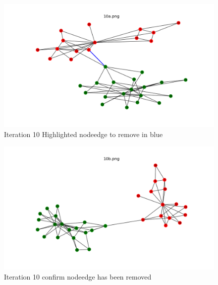 \documentclass[12pt]{article}
\begin{document}
\begin{figure}[H]
\centering
\includegraphics[trim=0 0 0 0, clip, width=\textwidth] {10a.png}
\caption{Iteration 10 Highlighted nodeedge to remove in blue }
\label{fig:q110a}
\end{figure}
\begin{figure}[H]
\centering
\includegraphics[trim=0 0 0 0, clip, width=\textwidth] {10b.png}
\caption{Iteration 10 confirm nodeedge has been removed }
\label{fig:q110b}
\end{figure}
\end{document}
